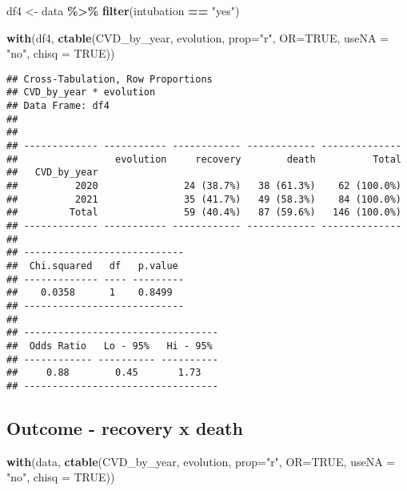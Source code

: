 \documentclass[
]{article}
\newenvironment{Shaded}{\begin{snugshade}}{\end{snugshade}}
\newcommand{\AttributeTok}[1]{\textcolor[rgb]{0.13,0.29,0.53}{#1}}
\newcommand{\ConstantTok}[1]{\textcolor[rgb]{0.56,0.35,0.01}{#1}}
\newcommand{\FunctionTok}[1]{\textcolor[rgb]{0.13,0.29,0.53}{\textbf{#1}}}
\newcommand{\NormalTok}[1]{#1}
\newcommand{\OtherTok}[1]{\textcolor[rgb]{0.56,0.35,0.01}{#1}}
\newcommand{\SpecialCharTok}[1]{\textcolor[rgb]{0.81,0.36,0.00}{\textbf{#1}}}
\newcommand{\StringTok}[1]{\textcolor[rgb]{0.31,0.60,0.02}{#1}}
\begin{document}
\begin{Shaded}
\begin{Highlighting}[]
\NormalTok{df4 }\OtherTok{\textless{}{-}}\NormalTok{ data }\SpecialCharTok{\%\textgreater{}\%} 
  \FunctionTok{filter}\NormalTok{(intubation }\SpecialCharTok{==} \StringTok{"yes"}\NormalTok{)}

\FunctionTok{with}\NormalTok{(df4, }\FunctionTok{ctable}\NormalTok{(CVD\_by\_year, evolution, }\AttributeTok{prop=}\StringTok{"r"}\NormalTok{, }\AttributeTok{OR=}\ConstantTok{TRUE}\NormalTok{, }\AttributeTok{useNA =} \StringTok{"no"}\NormalTok{, }\AttributeTok{chisq =} \ConstantTok{TRUE}\NormalTok{))}
\end{Highlighting}
\end{Shaded}

\begin{verbatim}
## Cross-Tabulation, Row Proportions  
## CVD_by_year * evolution  
## Data Frame: df4  
## 
## 
## ------------- ----------- ------------ ------------ --------------
##                 evolution     recovery        death          Total
##   CVD_by_year                                                     
##          2020               24 (38.7%)   38 (61.3%)    62 (100.0%)
##          2021               35 (41.7%)   49 (58.3%)    84 (100.0%)
##         Total               59 (40.4%)   87 (59.6%)   146 (100.0%)
## ------------- ----------- ------------ ------------ --------------
## 
## ----------------------------
##  Chi.squared   df   p.value 
## ------------- ---- ---------
##    0.0358      1    0.8499  
## ----------------------------
## 
## ----------------------------------
##  Odds Ratio   Lo - 95%   Hi - 95% 
## ------------ ---------- ----------
##     0.88        0.45       1.73   
## ----------------------------------
\end{verbatim}

\hypertarget{outcome---recovery-x-death-1}{%
\subsection{Outcome - recovery x
death}\label{outcome---recovery-x-death-1}}

\begin{Shaded}
\begin{Highlighting}[]
\FunctionTok{with}\NormalTok{(data, }\FunctionTok{ctable}\NormalTok{(CVD\_by\_year, evolution, }\AttributeTok{prop=}\StringTok{"r"}\NormalTok{, }\AttributeTok{OR=}\ConstantTok{TRUE}\NormalTok{, }\AttributeTok{useNA =} \StringTok{"no"}\NormalTok{, }\AttributeTok{chisq =} \ConstantTok{TRUE}\NormalTok{))}
\end{Highlighting}
\end{Shaded}
\end{document}
